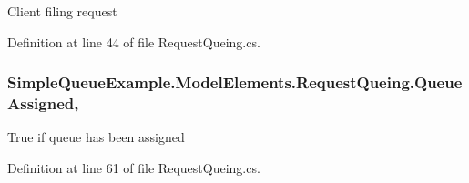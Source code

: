 Client filing request 



Definition at line 44 of file Request\+Queing.\+cs.

\subsubsection[{\texorpdfstring{Queue\+Assigned}{QueueAssigned}}]{ Simple\+Queue\+Example.\+Model\+Elements.\+Request\+Queing.\+Queue\+Assigned\hspace{0.3cm}{\ttfamily [get]}, {\ttfamily [set]}}\hypertarget{class_simple_queue_example_1_1_model_elements_1_1_request_queing_acc9831be47a23fdd6a05f68552fa1517}{}\label{class_simple_queue_example_1_1_model_elements_1_1_request_queing_acc9831be47a23fdd6a05f68552fa1517}


True if queue has been assigned 



Definition at line 61 of file Request\+Queing.\+cs.

